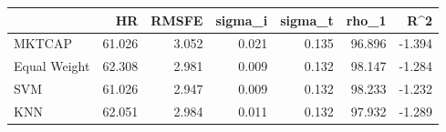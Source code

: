 \begin{tabular}{lrrrrrr}
\toprule
{} &     HR &   RMSFE &  sigma\_i &  sigma\_t &  rho\_1 &    R\textasciicircum 2 \\
\midrule
MKTCAP       & 61.026 &   3.052 &    0.021 &    0.135 & 96.896 & -1.394 \\
Equal Weight & 62.308 &   2.981 &    0.009 &    0.132 & 98.147 & -1.284 \\
SVM          & 61.026 &   2.947 &    0.009 &    0.132 & 98.233 & -1.232 \\
KNN          & 62.051 &   2.984 &    0.011 &    0.132 & 97.932 & -1.289 \\
\bottomrule
\end{tabular}
